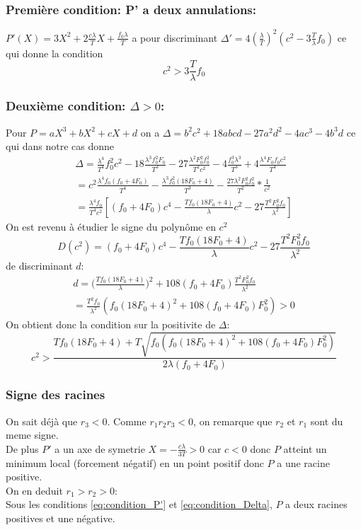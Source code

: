 \documentclass[12pt]{extarticle}
\newcommand{\Tl}{\frac{T}{\lambda}}
\begin{document}
\subsubsection{Première condition: P' a deux annulations:}
$P'(X)= 3X^2+ 2\frac{c\lambda}{T}X+ \frac{f_0\lambda}{T}$ a pour discriminant $\Delta'=4(\frac{\lambda}{T})^2(c^2-3 \Tl f_0)$ ce qui donne la condition \begin{equation} \label{eq:condition_P'}
	\boxed{c^2 >3\Tl f_0
	}
\end{equation}
\subsubsection{Deuxième condition: $\Delta>0$:}
Pour $P=aX^3 +bX^2 + cX + d$ on a $\Delta= b^2c^2 +18abcd-27a^2d^2 -4ac^3 -4b^3d$ ce qui dans notre cas donne
\begin{align*}
	\Delta=\frac{\lambda^4}{T^4}f_0^2c^2 -18 \frac{\lambda^3f_0^2F_0}{T^3}-27 \frac{\lambda^2 F_0^2 f_0^2}{T^2c^2} - 4 \frac{f_0^3\lambda^3}{T^3}+4 \frac{\lambda^4F_0f_0c^2}{T^4} \\ = c^2 \frac{\lambda^4f_0(f_0+4F_0)}{T^4}- \frac{\lambda^3f_0^2(18F_0+4)}{T^3} -\frac{27\lambda^2F_0^2f_0^2}{T^2}* \frac{1}{c^2}\\ 
=	\frac{\lambda^4f_0}{T^4c^2}[(f_0+4F_0)c^4-\frac{Tf_0(18F_0+4)}{\lambda} c^2 - 27 \frac{T^2F_0^2f_0}{\lambda^2}] \end{align*}
On est revenu à étudier le signe du polynôme en $c^2$ \begin{equation}
	D(c^2)=(f_0+4F_0)c^4-\frac{Tf_0(18F_0+4)}{\lambda} c^2 - 27 \frac{T^2F_0^2f_0}{\lambda^2}
\end{equation} 
de discriminant $d$:
\begin{align*}
	d=\Big(\frac{Tf_0(18F_0+4)}{\lambda} \Big)^2 +108(f_0+4F_0)\frac{T^2F_0^2f_0}{\lambda^2} \\ 
	= \frac{T^2f_0}{\lambda^2}(f_0(18F_0+4)^2+108(f_0+4F_0)F_0^2) >0
\end{align*}
On obtient donc la condition sur la positivite de $\Delta$: 
\begin{equation}\boxed{
	c^2> \frac{Tf_0(18F_0+4)+T\sqrt{f_0(f_0(18F_0+4)^2+108(f_0+4F_0)F_0^2)}}{2\lambda(f_0+4F_0)}
	}\label{eq:condition_Delta}
\end{equation}
\subsubsection{Signe des racines}
On sait déjà que $r_3<0$. Comme $r_1r_2r_3<0$, on remarque que $r_2$ et $r_1$ sont du meme signe.\\
De plus $P'$ a un axe de symetrie $X=-\frac{c\lambda}{3T}>0$ car $c<0$ donc $P$ atteint un minimum local (forcement négatif) en un point positif donc $P$ a une racine positive.\\
On en deduit $r_1>r_2>0$: \\ 
Sous les conditions \eqref{eq:condition_P'} et \eqref{eq:condition_Delta}, $P$ a deux racines positives et une négative.\newpage
\end{document}
